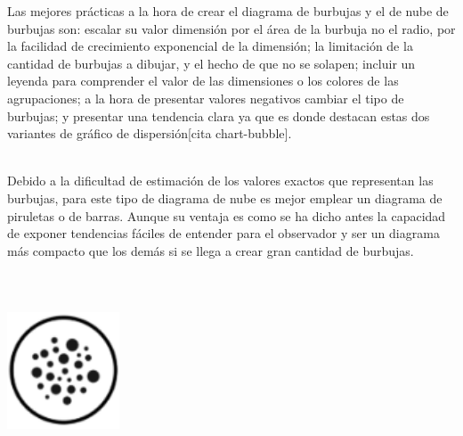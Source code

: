 \documentclass{article}\usepackage[]{graphicx}\usepackage[]{color}
\begin{document}
Las mejores pr\'acticas a la hora de crear el diagrama de burbujas y el de nube de burbujas son: escalar su valor dimensi\'on por el \'area de la burbuja no el radio, por la facilidad de crecimiento exponencial de la dimensi\'on; la limitaci\'on de la cantidad de burbujas a dibujar, y el hecho de que no se solapen; incluir un leyenda para comprender el valor de las dimensiones o los colores de las agrupaciones; a la hora de presentar valores negativos cambiar el tipo de burbujas; y presentar una tendencia clara ya que es donde destacan estas dos variantes de gr\'afico de dispersi\'on[cita chart-bubble].~\\~\par
Debido a la dificultad de estimaci\'on de los valores exactos que representan las burbujas, para este tipo de diagrama de nube es mejor emplear un diagrama de piruletas o de barras. Aunque su ventaja es como se ha dicho antes la capacidad de exponer tendencias f\'aciles de entender para el observador y ser un diagrama m\'as compacto que los dem\'as si se llega a crear gran cantidad de burbujas.
~\\~\\~\\~\\
\vbox{
    \centering
    \includegraphics[width=0.25\textwidth]{imag/bubbles}
}
\clearpage
\end{document}
